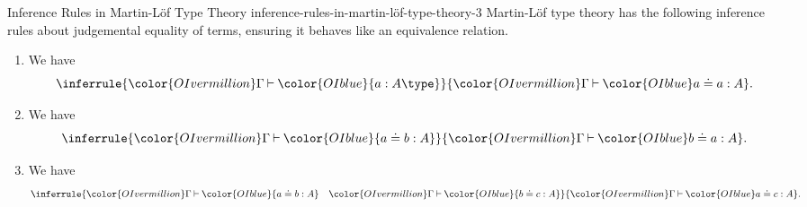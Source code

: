 \begin{definition}{Inference Rules in Martin-Löf Type Theory \rmIII}{inference-rules-in-martin-löf-type-theory-3}%
    Martin-Löf type theory has the following inference rules about judgemental equality of terms, ensuring it behaves like an equivalence relation.
    \begin{enumerate}
        \item\label{inference-rules-in-martin-löf-type-theory-3-reflexivity}We have
            \[
                \inferrule{{\color{OIvermillion}\Gamma}\mathbin{\vdash}{\color{OIblue}{a:A\type}}}{{\color{OIvermillion}\Gamma}\mathbin{\vdash}{\color{OIblue}a\doteq a:A}}.%
            \]%
        \item\label{inference-rules-in-martin-löf-type-theory-3-symmetry}We have
            \[
                \inferrule{{\color{OIvermillion}\Gamma}\mathbin{\vdash}{\color{OIblue}{a\doteq b:A}}}{{\color{OIvermillion}\Gamma}\mathbin{\vdash}{\color{OIblue}b\doteq a:A}}.%
            \]%
        \item\label{inference-rules-in-martin-löf-type-theory-3-transitivity}We have
            \[
                \inferrule{{\color{OIvermillion}\Gamma}\mathbin{\vdash}{\color{OIblue}{a\doteq b:A}}\quad{\color{OIvermillion}\Gamma}\mathbin{\vdash}{\color{OIblue}{b\doteq c:A}}}{{\color{OIvermillion}\Gamma}\mathbin{\vdash}{\color{OIblue}a\doteq c:A}}.%
            \]%
    \end{enumerate}
\end{definition}
